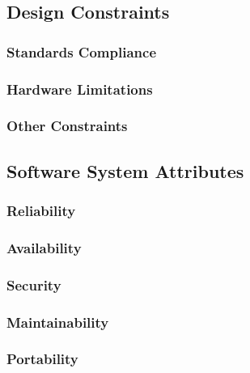 \documentclass[a4paper]{article}
\begin{document}
    
    \subsection{Design Constraints}
    
        \subsubsection{Standards Compliance}
        
        \subsubsection{Hardware Limitations}
        
        \subsubsection{Other Constraints}
    
    \subsection{Software System Attributes}
        
        \subsubsection{Reliability}
        
        \subsubsection{Availability}
        
        \subsubsection{Security}
        
        \subsubsection{Maintainability}
        
        \subsubsection{Portability}
        
\newpage
\end{document}
